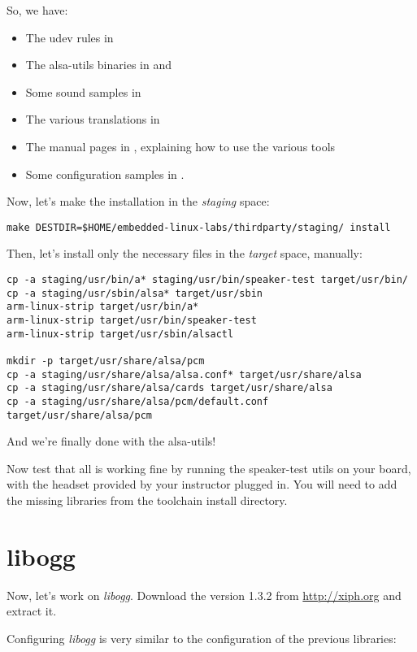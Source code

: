 So, we have:
\begin{itemize}
\item The udev rules in 
\item The alsa-utils binaries in  and 
\item Some sound samples in 
\item The various translations in 
\item The manual pages in , explaining how to
  use the various tools
\item Some configuration samples in .
\end{itemize}

Now, let's make the installation in the {\em staging} space:

\begin{verbatim}
make DESTDIR=$HOME/embedded-linux-labs/thirdparty/staging/ install
\end{verbatim}

Then, let's install only the necessary files in the {\em target}
space, manually:

\begin{verbatim}
cp -a staging/usr/bin/a* staging/usr/bin/speaker-test target/usr/bin/
cp -a staging/usr/sbin/alsa* target/usr/sbin
arm-linux-strip target/usr/bin/a*
arm-linux-strip target/usr/bin/speaker-test
arm-linux-strip target/usr/sbin/alsactl

mkdir -p target/usr/share/alsa/pcm
cp -a staging/usr/share/alsa/alsa.conf* target/usr/share/alsa
cp -a staging/usr/share/alsa/cards target/usr/share/alsa
cp -a staging/usr/share/alsa/pcm/default.conf target/usr/share/alsa/pcm
\end{verbatim}

And we're finally done with the alsa-utils!

Now test that all is working fine by running the speaker-test utils on
your board, with the headset provided by your instructor plugged
in. You will need to add the missing libraries from the toolchain
install directory.

\section{libogg}

Now, let's work on {\em libogg}. Download the version 1.3.2 from
\url{http://xiph.org} and extract it.

Configuring {\em libogg} is very similar to the configuration of the
previous libraries:

